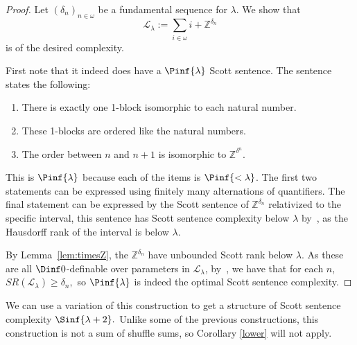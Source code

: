 \documentclass{amsart}
\newcommand{\SR}{SR}
\newcommand{\Z}{\mathbb{Z}}
\renewcommand{\L}{\mathcal{L}}
\begin{document}
\begin{proof}
Let $(\delta_n)_{n\in\omega}$ be a fundamental sequence for $\lambda$. We show that
\[\L_\lambda:=\sum_{i\in\omega}i+\Z^{\delta_n}\]
is of the desired complexity. 

First note that it indeed does have a $\Pinf{\lambda}$ Scott sentence. The sentence states the following:
\begin{enumerate}\tightlist
    \item There is exactly one 1-block isomorphic to each natural number. 
    \item These 1-blocks are ordered like the natural numbers.
    \item The order between $n$ and $n+1$ is isomorphic to $\Z^{\delta^n}.$
\end{enumerate}
This is $\Pinf{\lambda}$ because each of the items is $\Pinf{<\lambda}$. 
The first two statements can be expressed using finitely many alternations of quantifiers. 
The final statement can be expressed by the Scott sentence of $\Z^{\delta_n}$
relativized to the specific interval, this sentence has Scott sentence
complexity below $\lambda$ by~\cite{AR20}, as the Hausdorff rank of the interval
is below $\lambda$. 

By Lemma~\ref{lem:timesZ}, the $\Z^{\delta_n}$ have unbounded Scott rank below $\lambda$. 
As these are all $\Dinf0$-definable over parameters in $\L_\lambda$,
by~\cite[Lemma 4.3]{MonIntermediate}, we have that for each $n$, $\SR(\L_\lambda)\geq\delta_n,$ so $\Pinf{\lambda}$ is indeed the optimal Scott sentence complexity.
\end{proof}


We can use a variation of this construction to get a structure of Scott sentence complexity $\Sinf{\lambda+2}.$
Unlike some of the previous constructions, this construction is not a sum of shuffle sums, so Corollary \ref{lower} will not apply.
\end{document}
